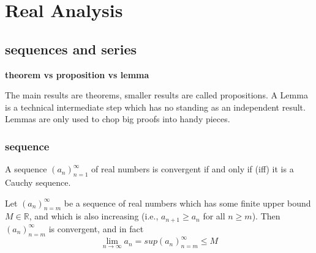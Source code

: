 \part{Real Analysis}

\chapter{sequences and series}

\textbf{theorem vs proposition vs lemma} \newline

The main results are theorems, smaller results are called propositions.
A Lemma is a technical intermediate step which has no standing as an independent result.
Lemmas are only used to chop big proofs into handy pieces.

\section{sequence}

\begin{theorem}
A sequence $(a_n)^{\infty}_{n=1}$ of real numbers is convergent if and only if (iff) it is a Cauchy sequence.
\end{theorem}

\begin{proposition}
Let $(a_n)^\infty_{n=m}$ be a sequence of real numbers which has some
finite upper bound $M \in \mathbb{R} $, and which is also increasing (i.e., $a_{n+1} \ge a_n$ for all $n \ge m$).
Then $(a_n)^\infty_{n=m}$ is convergent, and in fact
\begin{equation*}
\lim_{n \to \infty} a_n = sup(a_n)^\infty_{n=m} \le M
\end{equation*}
\end{proposition}